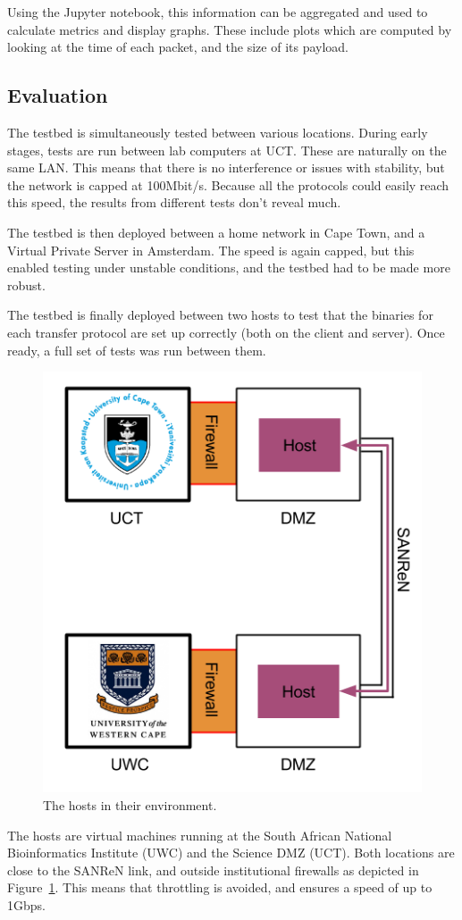 \documentclass{sig-alternate-05-2015}
\begin{document}
Using the Jupyter notebook, this information can be aggregated and used to calculate metrics and display graphs. These include plots which are computed by looking at the time of each packet, and the size of its payload.


\subsection{Evaluation}
The testbed is simultaneously tested between various locations. During early stages, tests are run between lab computers at UCT. These are naturally on the same LAN. This means that there is no interference or issues with stability, but the network is capped at 100Mbit/s. Because all the protocols could easily reach this speed, the results from different tests don't reveal much.

The testbed is then deployed between a home network in Cape Town, and a Virtual Private Server in Amsterdam. The speed is again capped, but this enabled testing under unstable conditions, and the testbed had to be made more robust.

The testbed is finally deployed between two hosts to test that the binaries for each transfer protocol are set up correctly (both on the client and server). Once ready, a full set of tests was run between them.

\begin{figure}[t]
\centering
	\includegraphics[width=.6\linewidth]{img/route.png}
\caption{The hosts in their environment.\label{fig:route}}
\end{figure}

The hosts are virtual machines running at the South African National Bioinformatics Institute (UWC) and the Science DMZ (UCT). Both locations are close to the SANReN link, and outside institutional firewalls as depicted in Figure~\ref{fig:route}. This means that throttling is avoided, and ensures a speed of up to 1Gbps.
\end{document}
